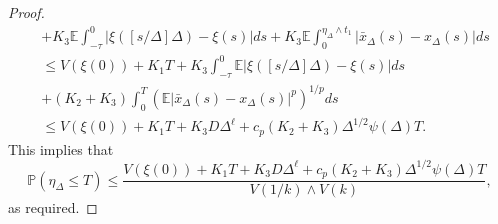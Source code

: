 \documentclass[10pt,a4paper]{amsart}
\begin{document}
\begin{proof}
\begin{align*}
&+K_3\mathbb{E}\int_{-\tau}^{0}|\xi([s/\Delta]\Delta)-\xi(s)|ds+K_3\mathbb{E}\int_{0}^{\eta_{\Delta}\wedge t_1}\vert \bar{x}_{\Delta}(s)-x_{\Delta}(s)\vert ds\\
&\le  V(\xi(0))+K_1T+K_3\int_{-\tau}^0\mathbb{E}|\xi([s/\Delta]\Delta)-\xi(s)|ds\\
&+(K_2+K_3)\int_{0}^T(\mathbb{E}\vert \bar{x}_{\Delta}(s)-x_{\Delta}(s)\vert^p)^{1/p}ds\\
&\le V(\xi(0))+K_1T+K_3D\Delta^{\ell}+c_p(K_2+K_3)\Delta^{1/2}\psi(\Delta)T.
\end{align*}
This implies that 
\begin{equation*}
 \mathbb{P}(\eta_{\Delta}\leq T)\leq \frac{V(\xi(0))+K_1T+K_3D\Delta^{\ell}+c_p(K_2+K_3)\Delta^{1/2}\psi(\Delta)T}{V(1/k)\wedge V(k)},
\end{equation*}
as required.
\end{proof}
\end{document}
